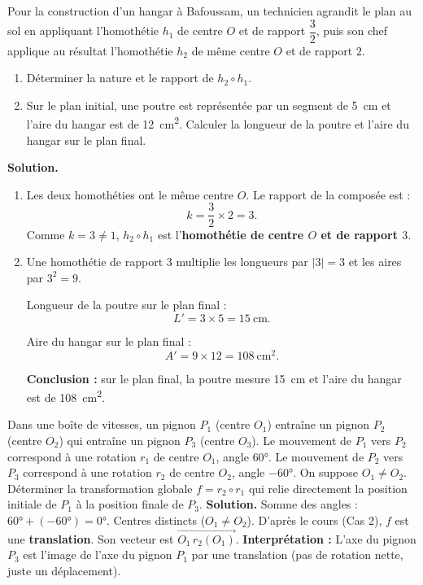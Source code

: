 \documentclass[11pt]{article}
\begin{document}
\begin{exoresolu}
Pour la construction d'un hangar à Bafoussam, un technicien agrandit le plan au sol en appliquant l'homothétie $h_1$ de centre $O$ et de rapport $\dfrac{3}{2}$, puis son chef applique au résultat l'homothétie $h_2$ de même centre $O$ et de rapport $2$.
\begin{enumerate}
\item Déterminer la nature et le rapport de $h_2 \circ h_1$.
\item Sur le plan initial, une poutre est représentée par un segment de \SI{5}{cm} et l'aire du hangar est de \SI{12}{cm^2}. Calculer la longueur de la poutre et l'aire du hangar sur le plan final.
\end{enumerate}
\tcblower
\textbf{Solution.}
\begin{enumerate}
\item Les deux homothéties ont le même centre $O$. Le rapport de la composée est :
\[ k = \frac{3}{2} \times 2 = 3. \]
Comme $k = 3 \neq 1$, $h_2 \circ h_1$ est l'\textbf{homothétie de centre $O$ et de rapport $3$}.

\item Une homothétie de rapport $3$ multiplie les longueurs par $|3| = 3$ et les aires par $3^2 = 9$.

Longueur de la poutre sur le plan final :
\[ L' = 3 \times 5 = 15 \ \text{cm}. \]

Aire du hangar sur le plan final :
\[ A' = 9 \times 12 = 108 \ \text{cm}^2. \]

\textbf{Conclusion :} sur le plan final, la poutre mesure \SI{15}{cm} et l'aire du hangar est de \SI{108}{cm^2}.
\end{enumerate}
\end{exoresolu}

\begin{exoresolu}
Dans une boîte de vitesses, un pignon $P_1$ (centre $O_1$) entraîne un pignon $P_2$ (centre $O_2$) qui entraîne un pignon $P_3$ (centre $O_3$). Le mouvement de $P_1$ vers $P_2$ correspond à une rotation $r_1$ de centre $O_1$, angle $60°$. Le mouvement de $P_2$ vers $P_3$ correspond à une rotation $r_2$ de centre $O_2$, angle $-60°$. On suppose $O_1 \neq O_2$.
Déterminer la transformation globale $f = r_2 \circ r_1$ qui relie directement la position initiale de $P_1$ à la position finale de $P_3$.
\tcblower
\textbf{Solution.}
Somme des angles : $60° + (-60°) = 0°$.
Centres distincts ($O_1 \neq O_2$).
D'après le cours (Cas 2), $f$ est une \textbf{translation}.
Son vecteur est $\overrightarrow{O_1\, r_2(O_1)}$.
\textbf{Interprétation :} L'axe du pignon $P_3$ est l'image de l'axe du pignon $P_1$ par une translation (pas de rotation nette, juste un déplacement).
\end{exoresolu}
\end{document}
